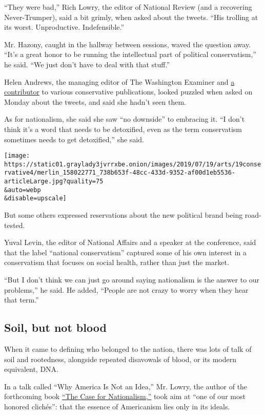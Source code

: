 ``They were bad,'' Rich Lowry, the editor of National Review (and a
recovering Never-Trumper), said a bit grimly, when asked about the
tweets. ``His trolling at its worst. Unproductive. Indefensible.''

Mr. Hazony, caught in the hallway between sessions, waved the question
away. ``It's a great honor to be running the intellectual part of
political conservatism,'' he said. ``We just don't have to deal with
that stuff.''

Helen Andrews, the managing editor of The Washington Examiner and
\href{https://www.firstthings.com/article/2019/08/our-socialist-moment}{a
contributor} to various conservative publications, looked puzzled when
asked on Monday about the tweets, and said she hadn't seen them.

As for nationalism, she said she saw ``no downside'' to embracing it.
``I don't think it's a word that needs to be detoxified, even as the
term conservatism sometimes needs to get detoxified,'' she said.

\texttt{[image: https://static01.graylady3jvrrxbe.onion/images/2019/07/19/arts/19conservative4/merlin\_158022771\_738b653f-48cc-433d-9352-af00d1eb5536-articleLarge.jpg?quality=75\\\&auto=webp\\\&disable=upscale]}

But some others expressed reservations about the new political brand
being road-tested.

Yuval Levin, the editor of National Affairs and a speaker at the
conference, said that the label ``national conservatism'' captured some
of his own interest in a conservatism that focuses on social health,
rather than just the market.

``But I don't think we can just go around saying nationalism is the
answer to our problems,'' he said. He added, ``People are not crazy to
worry when they hear that term.''

\hypertarget{soil-but-not-blood}{%
\subsection{Soil, but not blood}\label{soil-but-not-blood}}

When it came to defining who belonged to the nation, there was lots of
talk of soil and rootedness, alongside repeated disavowals of blood, or
its modern equivalent, DNA.

In a talk called ``Why America Is Not an Idea,'' Mr. Lowry, the author
of the forthcoming book
\href{https://www.harpercollins.com/9780062839640/the-case-for-nationalism/}{``The
Case for Nationalism,''} took aim at ``one of our most honored
clichés'': that the essence of Americanism lies only in its ideals.

